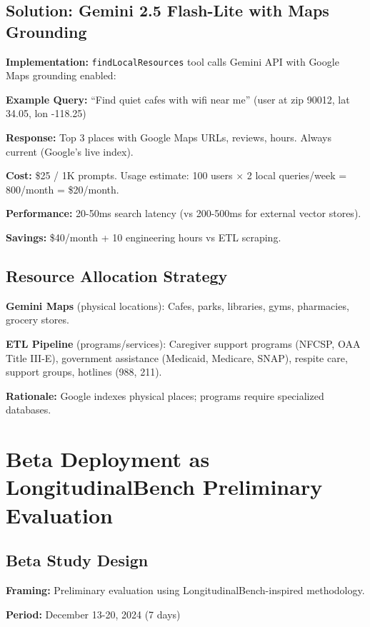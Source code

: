 \documentclass{article}
\begin{document}
%
\subsection{Solution: Gemini 2.5 Flash{-}Lite with Maps Grounding}%
\label{subsec:SolutionGemini2.5Flash{-}LitewithMapsGrounding}%
\textbf{Implementation:} \texttt{findLocalResources} tool calls Gemini API with Google Maps grounding enabled:

\textbf{Example Query:} ``Find quiet cafes with wifi near me'' (user at zip 90012, lat 34.05, lon -118.25)

\textbf{Response:} Top 3 places with Google Maps URLs, reviews, hours. Always current (Google's live index).

\textbf{Cost:} \$25 / 1K prompts. Usage estimate: 100 users $\times$ 2 local queries/week = 800/month = \$20/month.

\textbf{Performance:} 20-50ms search latency (vs 200-500ms for external vector stores).

\textbf{Savings:} \$40/month + 10 engineering hours vs ETL scraping.

%
\subsection{Resource Allocation Strategy}%
\label{subsec:ResourceAllocationStrategy}%
\textbf{Gemini Maps} (physical locations): Cafes, parks, libraries, gyms, pharmacies, grocery stores.

\textbf{ETL Pipeline} (programs/services): Caregiver support programs (NFCSP, OAA Title III-E), government assistance (Medicaid, Medicare, SNAP), respite care, support groups, hotlines (988, 211).

\textbf{Rationale:} Google indexes physical places; programs require specialized databases.

%
\section{Beta Deployment as LongitudinalBench Preliminary Evaluation}%
\label{sec:BetaDeploymentasLongitudinalBenchPreliminaryEvaluation}%
%
\subsection{Beta Study Design}%
\label{subsec:BetaStudyDesign}%
\textbf{Framing:} Preliminary evaluation using LongitudinalBench-inspired methodology.

\textbf{Period:} December 13-20, 2024 (7 days)
\end{document}
